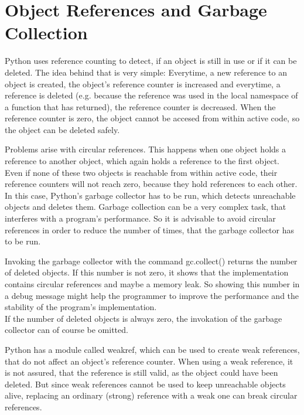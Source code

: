 	\section{Object References and Garbage Collection}
		\label{GarbageCollection}
		Python uses reference counting to detect, if an object is still in use or if it can be deleted.
		The idea behind that is very simple:
		Everytime, a new reference to an object is created, the object's reference counter is increased and everytime, a reference is deleted (e.g. because the reference was used in the local namespace of a function that has returned), the reference counter is decreased.
		When the reference counter is zero, the object cannot be accesed from within active code, so the object can be deleted safely.

		Problems arise with circular references.
		This happens when one object holds a reference to another object, which again holds a reference to the first object.
		Even if none of these two objects is reachable from within active code, their reference counters will not reach zero, because they hold references to each other.\\
		In this case, Python's garbage collector has to be run, which detects unreachable objects and deletes them.
		Garbage collection can be a very complex task, that interferes with a program's performance.
		So it is advisable to avoid circular references in order to reduce the number of times, that the garbage collector has to be run.

		Invoking the garbage collector with the command {\normalfont \ttfamily gc.collect()} returns the number of deleted objects.
		If this number is not zero, it shows that the implementation contains circular references and maybe a memory leak.
		So showing this number in a debug message might help the programmer to improve the performance and the stability of the program's implementation.\\
		If the number of deleted objects is always zero, the invokation of the garbage collector can of course be omitted.

		Python has a module called {\normalfont \ttfamily weakref}, which can be used to create weak references, that do not affect an object's reference counter.
		When using a weak reference, it is not assured, that the reference is still valid, as the object could have been deleted.
		But since weak references cannot be used to keep unreachable objects alive, replacing an ordinary (strong) reference with a weak one can break circular references.

